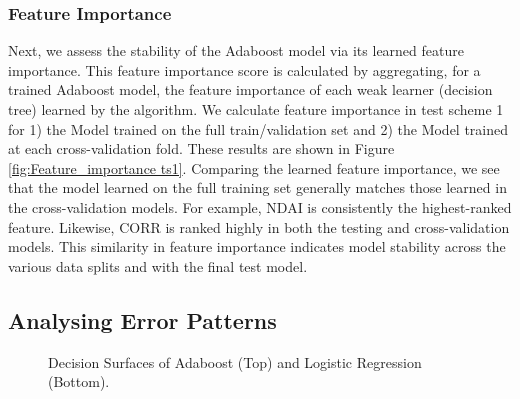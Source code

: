 \documentclass[11pt, letterpaper, journal]{IEEEtran}
\begin{document}
\subsubsection{Feature Importance}
Next, we assess the stability of the Adaboost model via its learned feature importance. This feature importance score is calculated by aggregating, for a trained Adaboost model, the feature importance of each weak learner (decision tree) learned by the algorithm. We calculate feature importance in test scheme 1 for 1) the Model trained on the full train/validation set and 2) the Model trained at each cross-validation fold. These results are shown in Figure \ref{fig:Feature_importance ts1}. Comparing the learned feature importance, we see that the model learned on the full training set generally matches those learned in the cross-validation models. For example, NDAI is consistently the highest-ranked feature. Likewise, CORR is ranked highly in both the testing and cross-validation models. This similarity in feature importance indicates model stability across the various data splits and with the final test model. 

\subsection{Analysing Error Patterns}
\begin{figure}[!h]
    \centering
    \qquad
    \caption{Decision Surfaces of Adaboost (Top) and Logistic Regression (Bottom). }
    \label{fig:decision_surface}
\end{figure}
\end{document}
